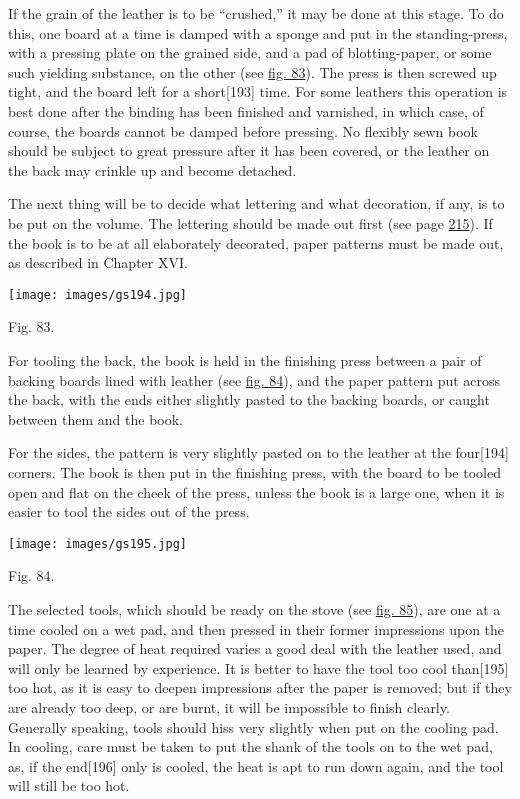 \documentclass[
]{article}
\begin{document}
If the grain of the leather is to be ``crushed,'' it may be done at this
stage. To do this, one board at a time is damped with a sponge and put
in the standing-press, with a pressing plate on the grained side, and a
pad of blotting-paper, or some such yielding substance, on the other
(see \protect\hyperlink{Fig_83}{fig. 83}). The press is then screwed up
tight, and the board left for a
short{\protect\hypertarget{Page_193}{}{{[}193{]}}} time. For some
leathers this operation is best done after the binding has been finished
and varnished, in which case, of course, the boards cannot be damped
before pressing. No flexibly sewn book should be subject to great
pressure after it has been covered, or the leather on the back may
crinkle up and become detached.

The next thing will be to decide what lettering and what decoration, if
any, is to be put on the volume. The lettering should be made out first
(see page \protect\hyperlink{Page_215}{215}). If the book is to be at
all elaborately decorated, paper patterns must be made out, as described
in Chapter XVI.

\protect\hypertarget{Fig_83}{}{}
\texttt{[image: images/gs194.jpg]}

Fig. 83.

For tooling the back, the book is held in the finishing press between a
pair of backing boards lined with leather (see
\protect\hyperlink{Fig_84}{fig. 84}), and the paper pattern put across
the back, with the ends either slightly pasted to the backing boards, or
caught between them and the book.

For the sides, the pattern is very slightly pasted on to the leather at
the four{\protect\hypertarget{Page_194}{}{{[}194{]}}} corners. The book
is then put in the finishing press, with the board to be tooled open and
flat on the cheek of the press, unless the book is a large one, when it
is easier to tool the sides out of the press.

\protect\hypertarget{Fig_84}{}{}
\texttt{[image: images/gs195.jpg]}

Fig. 84.

The selected tools, which should be ready on the stove (see
\protect\hyperlink{Fig_85}{fig. 85}), are one at a time cooled on a wet
pad, and then pressed in their former impressions upon the paper. The
degree of heat required varies a good deal with the leather used, and
will only be learned by experience. It is better to have the tool too
cool than{\protect\hypertarget{Page_195}{}{{[}195{]}}} too hot, as it is
easy to deepen impressions after the paper is removed; but if they are
already too deep, or are burnt, it will be impossible to finish clearly.
Generally speaking, tools should hiss very slightly when put on the
cooling pad. In cooling, care must be taken to put the shank of the
tools on to the wet pad, as, if the
end{\protect\hypertarget{Page_196}{}{{[}196{]}}} only is cooled, the
heat is apt to run down again, and the tool will still be too hot.
\end{document}
